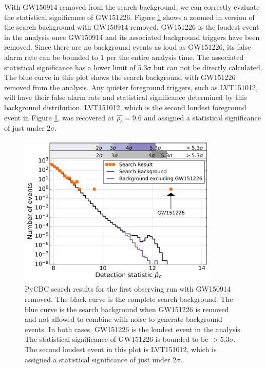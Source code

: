With GW150914 removed from the search background, we can correctly evaluate the 
statistical significance of GW151226. 
Figure \ref{fig:pycbc-hist-gw151226} shows a zoomed in version
of the search background with GW150914 removed. 
GW151226 is the loudest event in the analysis once GW150914 and its associated 
background triggers have been removed. Since there are no background events 
as loud as GW151226, its false alarm rate can be bounded to 1 per the entire 
analysis time. The associated statistical significance has a lower limit of 
$5.3\sigma$ but can not be directly calculated. The blue curve in this plot 
shows the search background with GW151226 removed from the analysis. Any 
quieter foreground triggers, such as LVT151012, will have their false alarm 
rate and statistical significance determined by this background distribution.  
LVT151012, which is the second loudest foreground event in Figure 
\ref{fig:pycbc-hist-gw151226}, was recovered at $\hat{\rho_c} = 9.6$ and 
assigned a statistical significance of just under $2\sigma$.  

\begin{figure}[ht!]%
\includegraphics[width=0.85\textwidth]{figures/O1/pycbc_hist_GW151226}
\caption[PyCBC result histograms for GW151226]{PyCBC search results for the %
         first observing run with GW150914 removed. The black curve is the %
         complete search background. The blue curve is the search background %
         when GW151226 is removed and not allowed to combine with noise to %
         generate background events. In both cases, GW151226 is the loudest %
         event in the analysis. The statistical significance of GW151226 %
         is bounded to be $> 5.3\sigma$. The second loudest event in this %
         plot is LVT151012, which is assigned a statistical significance of %
         just under $2\sigma$.}
\label{fig:pycbc-hist-gw151226}
\end{figure}

